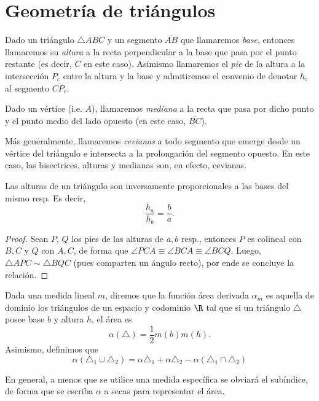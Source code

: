 \documentclass[11pt,a4paper]{book}
\begin{document}
\section{Geometría de triángulos}
\begin{mydef}
	Dado un triángulo $\triangle ABC$ y un segmento $\overline{AB}$ que llamaremos \textit{base}, entonces llamaremos su \textit{altura} a la recta perpendicular a la base que pasa por el punto restante (es decir, $C$ en este caso). Asimismo llamaremos el \textit{pie} de la altura a la intersección $P_c$ entre la altura y la base y admitiremos el convenio de denotar $h_c$ al segmento $\overline{CP_c}$.

	Dado un vértice (i.e. $A$), llamaremos \textit{mediana} a la recta que pasa por dicho punto y el punto medio del lado opuesto (en este caso, $\overline{BC}$).

	Más generalmente, llamaremos \textit{cevianas} a todo segmento que emerge desde un vértice del triángulo e intersecta a la prolongación del segmento opuesto. En este caso, las bisectrices, alturas y medianas son, en efecto, cevianas.
\end{mydef}
\begin{thm}
Las alturas de un triángulo son inversamente proporcionales a las bases del mismo resp. Es decir,
	$$\frac{h_a}{h_b}=\frac{b}{a}.$$
\end{thm}
\begin{proof}
	Sean $P$, $Q$ los pies de las alturas de $a,b$ resp., entonces $P$ es colineal con $B,C$ y $Q$ con $A,C$, de forma que $\angle PCA\equiv\angle BCA \equiv\angle BCQ$. Luego, $\triangle APC\sim\triangle BQC$ (pues comparten un ángulo recto), por ende se concluye la relación.
\end{proof}
\begin{mydef}[Área]
	Dada una medida lineal $m$, diremos que la función área derivada $\alpha_m$ es aquella de dominio los triángulos de un espacio y codominio $\R$ tal que si un triángulo $\triangle$ posee base $b$ y altura $h$, el área es
	$$\alpha(\triangle)=\frac 12m(b)m(h).$$
	Asimismo, definimos que
	$$\alpha(\triangle_1 \cup \triangle_2)= \alpha\triangle_1 + \alpha\triangle_2 - \alpha(\triangle_1\cap\triangle_2)$$
\end{mydef}
En general, a menos que se utilice una medida específica se obviará el subíndice, de forma que se escriba $\alpha$ a secas para representar el área.
\end{document}
